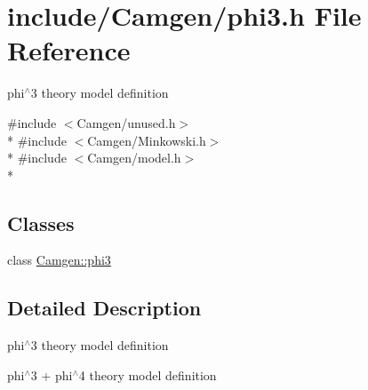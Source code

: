 \hypertarget{a00719}{}\section{include/\+Camgen/phi3.h File Reference}
\label{a00719}


phi$^\wedge$3 theory model definition  


{\ttfamily \#include $<$Camgen/unused.\+h$>$}\\*
{\ttfamily \#include $<$Camgen/\+Minkowski.\+h$>$}\\*
{\ttfamily \#include $<$Camgen/model.\+h$>$}\\*
\subsection*{Classes}
\begin{DoxyCompactItemize}
\item 
class \hyperlink{a00424}{Camgen\+::phi3}
\end{DoxyCompactItemize}


\subsection{Detailed Description}
phi$^\wedge$3 theory model definition 

phi$^\wedge$3 + phi$^\wedge$4 theory model definition